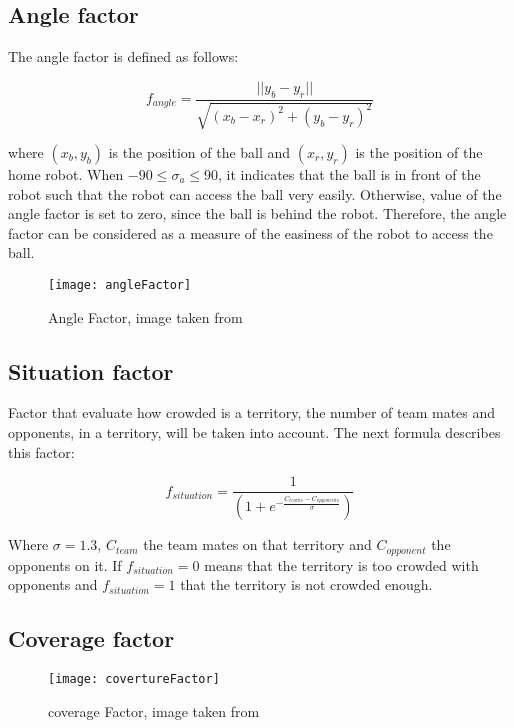 \documentclass[
10pt, %
a4paper, %
oneside, %
headinclude,footinclude, %
BCOR5mm, %
]{scrartcl}
\begin{document}
\subsection{Angle factor}
The angle factor is defined as follows:

\begin{equation}
	f_{angle} = \frac{||y_b - y_r||}{\sqrt{(x_b - x_r)^2 + (y_b - y_r)^2}}
\end{equation}

where $(x_b, y_b)$ is the position of the ball and $(x_r, y_r)$ is the position of the home robot.
When $-90 \leq \sigma_a \leq 90$, it indicates that the ball is in front of the robot such that the robot can access the ball very easily. Otherwise, value of the angle factor is set to zero, since the ball is behind the robot. Therefore, the angle factor can be considered as a measure of the easiness of the robot to access the ball.

\begin{figure}
	\centering
	\texttt{[image: angleFactor]}
	\caption{Angle Factor, image taken from \cite{wu2004fuzzy}}
	\label{fig:fig}
\end{figure}

\subsection{Situation factor}

Factor that evaluate how crowded is a territory, the number of team mates  and opponents, in a territory, will be taken into account. The next formula describes this factor:

\begin{equation}
	f_{situation} = \frac{1}{(1 + e^{-\frac{C_{teams} - C_{opponents}}{\sigma}})}
\end{equation} 

Where $\sigma = 1.3$, $C_{team}$ the team mates on that territory and $C_{opponent}$ the opponents on it. If $f_{situation}=0$ means that the territory is too crowded with opponents and $f_{situation} = 1$ that the territory is not crowded enough.


\subsection{Coverage factor}

\begin{figure}
	\centering
	\texttt{[image: covertureFactor]}
	\caption{coverage Factor, image taken from \cite{shi2015research}}
	\label{fig:fig}
\end{figure}
\end{document}
